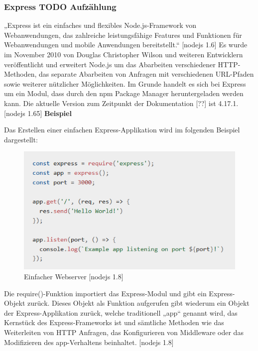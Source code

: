 \subsubsection{Express TODO Aufzählung}
„Express ist ein einfaches und flexibles Node.js-Framework von Webanwendungen, das zahlreiche leistungsfähige Features und Funktionen für Webanwendungen und mobile Anwendungen bereitstellt.“ [nodejs 1.6] Es wurde im November 2010 von Douglas Christopher Wilson und weiteren Entwicklern veröffentlicht und erweitert Node.js um das Abarbeiten verschiedener HTTP-Methoden, das separate Abarbeiten von Anfragen mit verschiedenen URL-Pfaden sowie weiterer nützlicher Möglichkeiten. Im Grunde handelt es sich bei Express um ein Modul, dass durch den npm Package Manager heruntergeladen werden kann. Die aktuelle Version zum Zeitpunkt der Dokumentation [??] ist 4.17.1. [nodejs 1.65] \newline
\newline
\textbf{Beispiel}
 \newline

Das Erstellen einer einfachen Express-Applikation wird im folgenden Beispiel dargestellt:\newline

\begin{figure}[h]
\centering
\includegraphics{images/nodejs_express_einfacherWebserver.PNG}
\caption{Einfacher Webserver [nodejs 1.8]}
\end{figure}


Die require()-Funktion importiert das Express-Modul und gibt ein Express-Objekt zurück. Dieses Objekt als Funktion aufgerufen gibt wiederum ein Objekt der Express-Applikation zurück, welche traditionell „app“ genannt wird, das Kernstück des Express-Frameworks ist und sämtliche Methoden wie das Weiterleiten von HTTP Anfragen, das Konfigurieren von Middleware oder das Modifizieren des app-Verhaltens beinhaltet. [nodejs 1.8]\newline 

